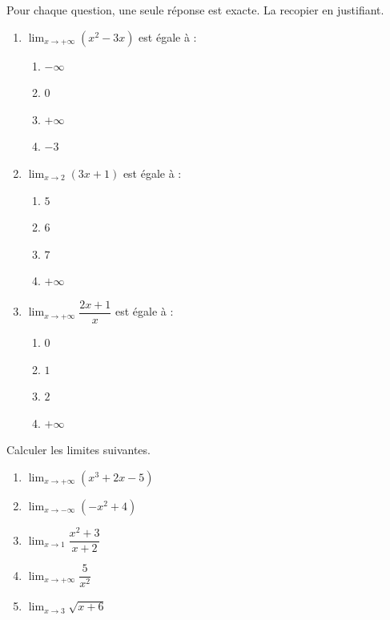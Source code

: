 \documentclass[11pt]{article}
\begin{document}
\begin{exercice}[QCM]
Pour chaque question, une seule réponse est exacte. La recopier en justifiant.
\begin{enumerate}
\item $\displaystyle\lim_{x\to +\infty} (x^2 - 3x)$ est égale à :
\begin{enumerate}
\item $-\infty$ \quad \item $0$ \quad \item $+\infty$ \quad \item $-3$
\end{enumerate}
\item $\displaystyle\lim_{x\to 2} (3x+1)$ est égale à :
\begin{enumerate}
\item $5$ \quad \item $6$ \quad \item $7$ \quad \item $+\infty$
\end{enumerate}
\item $\displaystyle\lim_{x\to +\infty} \dfrac{2x+1}{x}$ est égale à :
\begin{enumerate}
\item $0$ \quad \item $1$ \quad \item $2$ \quad \item $+\infty$
\end{enumerate}
\end{enumerate}
\end{exercice}

\begin{exercice}
Calculer les limites suivantes.
\begin{enumerate}
\item $\displaystyle\lim_{x\to +\infty} (x^3 + 2x - 5)$
\item $\displaystyle\lim_{x\to -\infty} (-x^2 + 4)$
\item $\displaystyle\lim_{x\to 1} \dfrac{x^2+3}{x+2}$
\item $\displaystyle\lim_{x\to +\infty} \dfrac{5}{x^2}$
\item $\displaystyle\lim_{x\to 3} \sqrt{x+6}$
\end{enumerate}
\end{exercice}
\end{document}
